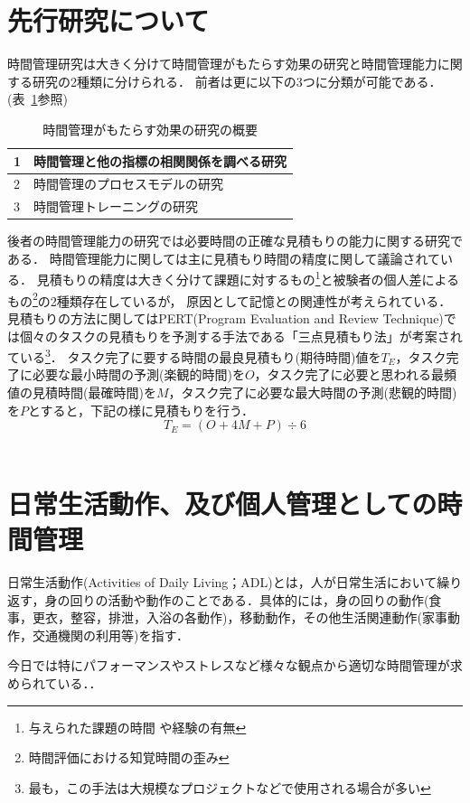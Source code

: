 \section{先行研究について}
時間管理研究は大きく分けて時間管理がもたらす効果の研究と時間管理能力に関する研究の2種類に分けられる．
前者は更に以下の3つに分類が可能である．(表~\ref{tb:senko}参照)
\begin{table}[htb]
\begin{center}
  \begin{tabular}{|l|l|} \hline
   1 & 時間管理と他の指標の相関関係を調べる研究 \\ \hline
   2 & 時間管理のプロセスモデルの研究 \\ \hline
   3 & 時間管理トレーニングの研究 \\ \hline
  \end{tabular}
  \caption{時間管理がもたらす効果の研究の概要}
  \label{tb:senko}
\end{center}
\end{table}

後者の時間管理能力の研究では必要時間の正確な見積もりの能力に関する研究である．
時間管理能力に関しては主に見積もり時間の精度に関して議論されている．
見積もりの精度は大きく分けて課題に対するもの\footnote{与えられた課題の時間 \cite{Roy2008}や経験の有無\cite{Roy2007}}と被験者の個人差によるもの\footnote{時間評価における知覚時間の歪み\cite{Oguro1961}\cite{Murakami2016}}の2種類存在しているが，
原因として記憶との関連性が考えられている\cite{Roy2005}．
見積もりの方法に関してはPERT(Program Evaluation and Review Technique)では個々のタスクの見積もりを予測する手法である「三点見積もり法」が考案されている\footnote{最も，この手法は大規模なプロジェクトなどで使用される場合が多い}．
タスク完了に要する時間の最良見積もり(期待時間)値を$T_{E}$，タスク完了に必要な最小時間の予測(楽観的時間)を$O$，タスク完了に必要と思われる最頻値の見積時間(最確時間)を$M$，タスク完了に必要な最大時間の予測(悲観的時間)を$P$とすると，下記の様に見積もりを行う．
\[ 
T_{E} = (O + 4M + P) ÷ 6
\]　

\section{日常生活動作、及び個人管理としての時間管理}
日常生活動作(Activities of Daily Living；ADL)とは，人が日常生活において繰り返す，身の回りの活動や動作のことである．具体的には，身の回りの動作(食事，更衣，整容，排泄，入浴の各動作)，移動動作，その他生活関連動作(家事動作，交通機関の利用等)を指す\cite{Sakai2003}．

今日では特にパフォーマンスやストレスなど様々な観点から適切な時間管理が求められている．\cite{Barling1996}\cite{Britton1991}\cite{Burt1994}\cite{Macan1994}．

